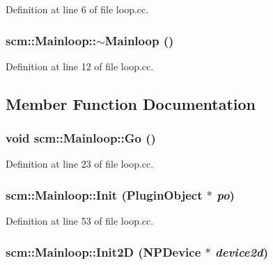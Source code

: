 Definition at line 6 of file loop.cc.

\hypertarget{classscm_1_1_mainloop_a0638591ae4a2df7e99d2ba586ad5edfe}{
\subsubsection[{$\sim$Mainloop}]{\setlength{\rightskip}{0pt plus 5cm}scm::Mainloop::$\sim$Mainloop ()}}
\label{classscm_1_1_mainloop_a0638591ae4a2df7e99d2ba586ad5edfe}


Definition at line 12 of file loop.cc.



\subsection{Member Function Documentation}
\hypertarget{classscm_1_1_mainloop_a7e332605f463847553999278a975d650}{
\subsubsection[{Go}]{\setlength{\rightskip}{0pt plus 5cm}void scm::Mainloop::Go ()}}
\label{classscm_1_1_mainloop_a7e332605f463847553999278a975d650}


Definition at line 23 of file loop.cc.

\hypertarget{classscm_1_1_mainloop_a3b4177ac538fb42bc7bed6bb5e84a6dc}{
\subsubsection[{Init}]{ scm::Mainloop::Init ({\bf PluginObject} $\ast$ {\em po})}}
\label{classscm_1_1_mainloop_a3b4177ac538fb42bc7bed6bb5e84a6dc}


Definition at line 53 of file loop.cc.

\hypertarget{classscm_1_1_mainloop_ab4e2e2a9df321c2761d24690a503cc06}{
\subsubsection[{Init2D}]{ scm::Mainloop::Init2D ({\bf NPDevice} $\ast$ {\em device2d})}}
\label{classscm_1_1_mainloop_ab4e2e2a9df321c2761d24690a503cc06}


